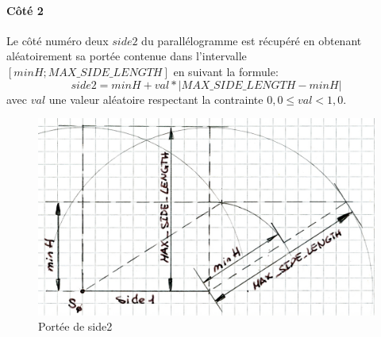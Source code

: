 \documentclass[a4paper, 12pt]{article}
\begin{document}
\paragraph{Côté 2}
Le côté numéro deux $\mathit{side2}$ du parallélogramme est récupéré en obtenant aléatoirement sa portée contenue dans l'intervalle $[minH;MAX\_SIDE\_LENGTH]$ en suivant la formule:
\[\mathit{side2} = minH + val * \left|MAX\_SIDE\_LENGTH-minH\right|   \] 
avec $val$ une valeur aléatoire respectant la contrainte $ 0,0 \le val < 1,0$.
\begin{figure}[h!]
 \centering
 \includegraphics[width=0.6\linewidth]{includes/images/creaQCar2}
 \caption{Portée de side2}
 \label{fig:creaqcar2}
\end{figure}
\end{document}
